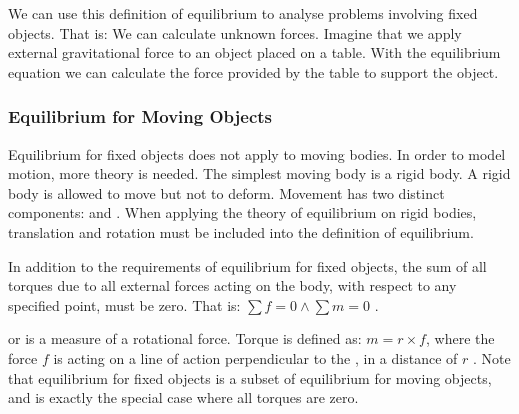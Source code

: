 We can use this definition of equilibrium to analyse problems involving
fixed objects. That is: We can calculate unknown forces. Imagine that
we apply external gravitational force to an object placed on a
table. With the equilibrium equation we can calculate the force
provided by the table to support the object. \\

\subsubsection{Equilibrium for Moving Objects}
Equilibrium for fixed objects does not apply to moving bodies. In order
to model motion, more theory is needed. The simplest moving body is a rigid
body. A rigid body is allowed to move but not to deform. 
Movement has two distinct components:  and
. When applying the theory of equilibrium on rigid
bodies, translation and rotation must be included into the definition
of equilibrium.

\begin{definition}
\label{dynamic-equilibrium}
In addition to the requirements of equilibrium for fixed objects, the
sum of all torques due to all external forces acting on the body, with
respect to any specified point, must be zero.
That is: $\sum f = 0 \wedge \sum m = 0$
.
\end{definition}

 or  is a measure of a
rotational force. Torque is defined as: $m = r \times f$, where the force
$f$ is acting on a line of action perpendicular to the , in
a distance of $r$ . Note that
equilibrium for fixed objects is a subset of equilibrium for moving
objects, and is exactly the special case where all torques are zero. \\


